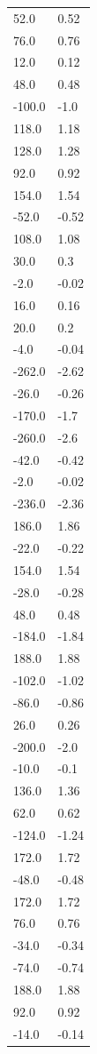 \begin{longtable}{ll}
52.0 & 0.52 \\
76.0 & 0.76 \\
12.0 & 0.12 \\
48.0 & 0.48 \\
-100.0 & -1.0 \\
118.0 & 1.18 \\
128.0 & 1.28 \\
92.0 & 0.92 \\
154.0 & 1.54 \\
-52.0 & -0.52 \\
108.0 & 1.08 \\
30.0 & 0.3 \\
-2.0 & -0.02 \\
16.0 & 0.16 \\
20.0 & 0.2 \\
-4.0 & -0.04 \\
-262.0 & -2.62 \\
-26.0 & -0.26 \\
-170.0 & -1.7 \\
-260.0 & -2.6 \\
-42.0 & -0.42 \\
-2.0 & -0.02 \\
-236.0 & -2.36 \\
186.0 & 1.86 \\
-22.0 & -0.22 \\
154.0 & 1.54 \\
-28.0 & -0.28 \\
48.0 & 0.48 \\
-184.0 & -1.84 \\
188.0 & 1.88 \\
-102.0 & -1.02 \\
-86.0 & -0.86 \\
26.0 & 0.26 \\
-200.0 & -2.0 \\
-10.0 & -0.1 \\
136.0 & 1.36 \\
62.0 & 0.62 \\
-124.0 & -1.24 \\
172.0 & 1.72 \\
-48.0 & -0.48 \\
172.0 & 1.72 \\
76.0 & 0.76 \\
-34.0 & -0.34 \\
-74.0 & -0.74 \\
188.0 & 1.88 \\
92.0 & 0.92 \\
-14.0 & -0.14 \\

\end{longtable}
